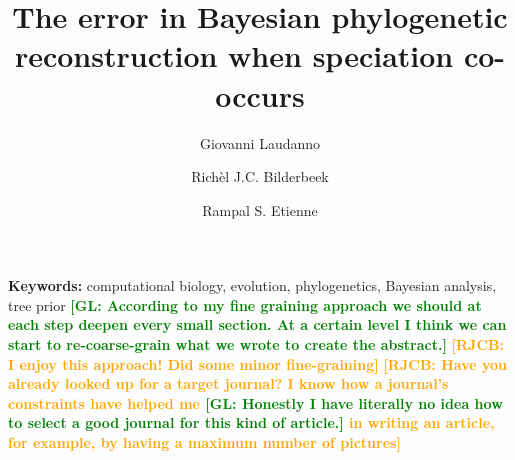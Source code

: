 \documentclass{article}
\title{The error in Bayesian phylogenetic reconstruction when speciation co-occurs}
\author[1]{Giovanni Laudanno}
\author[1]{Rich\`el J.C. Bilderbeek}
\author[1]{Rampal S. Etienne}
\affil[1]{Groningen Institute for Evolutionary Life Sciences, University of Groningen, Groningen, The Netherlands}
\newcommand*\richel[1]{\textcolor{orange}{\textbf{[RJCB: #1]}}}
\newcommand*\gio[1]{\textcolor{green}{\textbf{[GL: #1]}}}
\begin{document}
\maketitle

\begin{abstract}



  

  

  

  







\end{abstract}

{\bf Keywords:} computational biology, evolution, phylogenetics, Bayesian analysis, tree prior
\gio{According to my fine graining approach we should at each step deepen every small section. At a certain level I think we can start to re-coarse-grain what we wrote to create the abstract.}
\richel{I enjoy this approach! Did some minor fine-graining}
\richel{Have you already looked up for a target journal? I know how a journal's constraints have helped me 
\gio{Honestly I have literally no idea how to select a good journal for this kind of article.}
in writing an article, for example, by having a maximum number of pictures}
\end{document}
